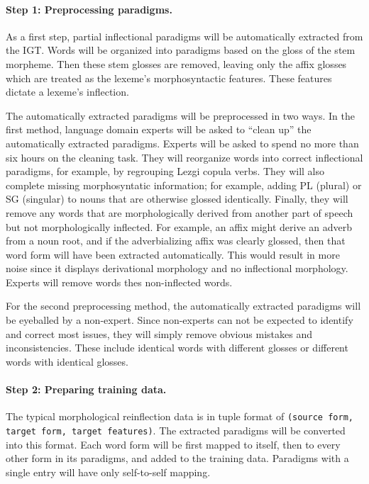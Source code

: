 \paragraph{Step 1: Preprocessing paradigms.}
As a first step, partial inflectional paradigms will be automatically extracted from the IGT. Words will be organized into paradigms based on the gloss of the stem morpheme. Then these stem glosses are removed, leaving only the affix glosses which are treated as the lexeme's morphosyntactic features. These features dictate a lexeme's inflection.

The automatically extracted paradigms will be preprocessed in two ways. In the first method, language domain experts will be asked to ``clean up'' the automatically extracted paradigms. Experts will be asked to spend no more than six hours on the cleaning task. They will reorganize words into correct inflectional paradigms, for example, by regrouping Lezgi copula verbs. They will also complete missing morphosyntatic information; for example, adding PL (plural) or SG (singular) to nouns that are otherwise glossed identically. Finally, they will remove any words that are morphologically derived from another part of speech but not morphologically inflected. For example, an affix might derive an adverb from a noun root, and if the adverbializing affix was clearly glossed, then that word form will have been extracted automatically. This would result in more noise since it displays derivational morphology and no inflectional morphology. Experts will remove words thes non-inflected words.

For the second preprocessing method, the automatically extracted paradigms will be eyeballed by a non-expert. Since non-experts can not be expected to identify and correct most issues, they will simply remove obvious mistakes and inconsistencies. These include identical words with different glosses or different words with identical glosses.


\paragraph{Step 2: Preparing training data.}
The typical morphological reinflection data is in tuple format of \texttt{(source form, target form, target features)}. The extracted paradigms will be converted into this format. Each word form will be first mapped to itself, then to every other form in its paradigms, and added to the training data. Paradigms with a single entry will have only self-to-self mapping. 


